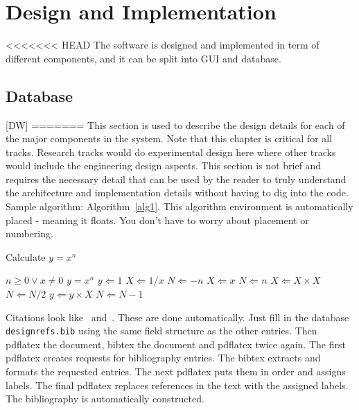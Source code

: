 
\chapter{Design  and Implementation}
<<<<<<< HEAD
The software is designed and implemented in term of different components, and it can be split into GUI and database. \\



\section{Database}
[DW]
=======
This section is used to describe the design details for each of the major components 
in the system.    Note that this chapter is critical for all tracks.  Research tracks would do experimental design here where other tracks would include the engineering design aspects.    This section is not brief and requires the necessary detail that 
can be used by the reader to truly understand the architecture and implementation 
details without having to dig into the code.    Sample algorithm:  Algorithm~\ref{alg1}.  This algorithm environment is automatically placed - meaning it floats.   You don't have to worry about placement or numbering.  

\begin{algorithm} [tbh]                     %
\caption{Calculate $y = x^n$}          %
\label{alg1}                           %
\begin{algorithmic}                    %
    \REQUIRE $n \geq 0 \vee x \neq 0$
    \ENSURE $y = x^n$
    \STATE $y \Leftarrow 1$
        \STATE $X \Leftarrow 1 / x$
        \STATE $N \Leftarrow -n$
    \ELSE
        \STATE $X \Leftarrow x$
        \STATE $N \Leftarrow n$
    \ENDIF
            \STATE $X \Leftarrow X \times X$
            \STATE $N \Leftarrow N / 2$
        \ELSE[$N$ is odd]
            \STATE $y \Leftarrow y \times X$
            \STATE $N \Leftarrow N - 1$
        \ENDIF
    \ENDWHILE
\end{algorithmic}
\end{algorithm}
Citations look like~\cite{Choset:2005:PRM, arkin2009governing, lavalle2006}  and~\cite{wiki:asimo,lumelsky:1987, nolfi2000evolutionary}.  These are done automatically.  Just fill in the database {\tt designrefs.bib} using the same field structure as the other entries.  Then pdflatex the document, bibtex the document and pdflatex twice again.  The first pdflatex creates requests for bibliography entries.
The bibtex extracts and formats the requested entries.  The next pdflatex puts them in order and assigns labels.  The final pdflatex replaces references in the text with the assigned labels.
The bibliography is automatically constructed.  
 

